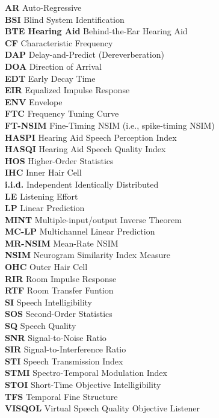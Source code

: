 
\textbf{AR} Auto-Regressive \\
\textbf{BSI} Blind System Identification \\
\textbf{BTE Hearing Aid} Behind-the-Ear Hearing Aid \\
\textbf{CF} Characteristic Frequency \\
\textbf{DAP} Delay-and-Predict (Dereverberation) \\
\textbf{DOA} Direction of Arrival \\
\textbf{EDT} Early Decay Time \\
\textbf{EIR} Equalized Impulse Response \\
\textbf{ENV} Envelope \\
\textbf{FTC} Frequency Tuning Curve \\
\textbf{FT-NSIM} Fine-Timing NSIM (i.e., spike-timing NSIM) \\
\textbf{HASPI} Hearing Aid Speech Perception Index \\
\textbf{HASQI} Hearing Aid Speech Quality Index \\
\textbf{HOS} Higher-Order Statistics \\
\textbf{IHC}  Inner Hair Cell \\
\textbf{i.i.d.} Independent Identically Distributed \\
\textbf{LE} Listening Effort \\
\textbf{LP}	 Linear Prediction \\
\textbf{MINT} Multiple-input/output Inverse Theorem \\
\textbf{MC-LP}		Multichannel Linear Prediction \\
\textbf{MR-NSIM} Mean-Rate NSIM \\
\textbf{NSIM} Neurogram Similarity Index Measure \\
\textbf{OHC} Outer Hair Cell \\
\textbf{RIR} Room Impulse Response \\
\textbf{RTF} Room Transfer Funtion \\
\textbf{SI} Speech Intelligibility \\
\textbf{SOS} Second-Order Statistics \\
\textbf{SQ} Speech Quality \\
\textbf{SNR} Signal-to-Noise Ratio \\
\textbf{SIR} Signal-to-Interference Ratio \\
\textbf{STI} Speech Transmission Index \\
\textbf{STMI} Spectro-Temporal Modulation Index \\
\textbf{STOI} Short-Time Objective Intelligibility \\
\textbf{TFS} Temporal Fine Structure \\
\textbf{VISQOL} Virtual Speech Quality Objective Listener \\

